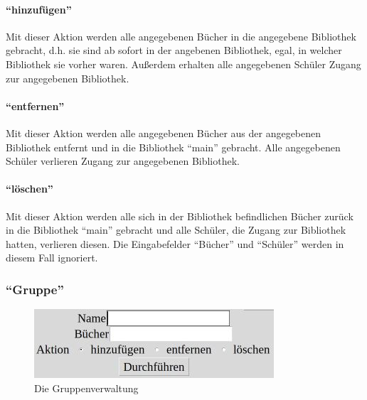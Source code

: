 \paragraph{``hinzufügen''}
Mit dieser Aktion werden alle angegebenen Bücher in die angegebene Bibliothek gebracht, d.h. sie sind ab sofort in der angebenen Bibliothek, egal, in welcher Bibliothek sie vorher waren. Außerdem erhalten alle angegebenen Schüler Zugang zur angegebenen Bibliothek.


\paragraph{``entfernen''}
Mit dieser Aktion werden alle angegebenen Bücher aus der angegebenen Bibliothek entfernt und in die Bibliothek ``main'' gebracht. Alle angegebenen Schüler verlieren Zugang zur angegebenen Bibliothek.

\paragraph{``löschen''}
Mit dieser Aktion werden alle sich in der Bibliothek befindlichen Bücher zurück in die Bibliothek ``main'' gebracht und alle Schüler, die Zugang zur Bibliothek hatten, verlieren diesen. Die Eingabefelder ``Bücher'' und ``Schüler'' werden in diesem Fall ignoriert.


\subsubsection{``Gruppe''}
\label{subsubsec:detail:edit:group}
\begin{figure}\includegraphics{images/gui2/edit_group.jpg}\caption{Die Gruppenverwaltung}\label{fig:edit_group}\end{figure}

